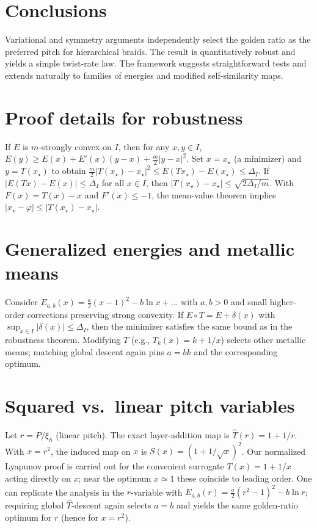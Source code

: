 \documentclass[11pt]{article}
\theoremstyle{remark}
\theoremstyle{definition}
\newcommand{\ph}{\varphi}
\begin{document}
\section{Conclusions}
Variational and symmetry arguments independently select the golden ratio as the preferred pitch for hierarchical braids. The result is quantitatively robust and yields a simple twist-rate law. The framework suggests straightforward tests and extends naturally to families of energies and modified self-similarity maps.

\appendix
\section{Proof details for robustness}
If $E$ is $m$-strongly convex on $I$, then for any $x,y\in I$, $E(y)\ge E(x)+E'(x)(y-x)+\tfrac{m}{2}|y-x|^2$. Set $x=x_\star$ (a minimizer) and $y=T(x_\star)$ to obtain $\tfrac{m}{2}|T(x_\star)-x_\star|^2\le E(Tx_\star)-E(x_\star)\le\Delta_I$. If $|E(Tx)-E(x)|\le\Delta_I$ for all $x\in I$, then $|T(x_\star)-x_\star|\le \sqrt{2\Delta_I/m}$. With $F(x)=T(x)-x$ and $F'(x)\le-1$, the mean-value theorem implies $|x_\star-\ph|\le |T(x_\star)-x_\star|$.

\section{Generalized energies and metallic means}
Consider $E_{a,b}(x)=\tfrac a2(x-1)^2 - b\ln x + \dots$ with $a,b>0$ and small higher-order corrections preserving strong convexity. If $E\circ T=E+\delta(x)$ with $\sup_{x\in I}|\delta(x)|\le\Delta_I$, then the minimizer satisfies the same bound as in the robustness theorem. Modifying $T$ (e.g., $T_k(x)=k+1/x$) selects other metallic means; matching global descent again pins $a=bk$ and the corresponding optimum.

\section{Squared vs.\ linear pitch variables}\label{app:squared-vs-linear}
Let $r=P/\xi_h$ (linear pitch). The exact layer-addition map is $\widehat T(r)=1+1/r$. With $x=r^2$, the induced map on $x$ is $S(x)=(1+1/\sqrt{x})^2$. Our normalized Lyapunov proof is carried out for the convenient surrogate $T(x)=1+1/x$ acting directly on $x$; near the optimum $x\simeq1$ these coincide to leading order. One can replicate the analysis in the $r$-variable with $E_{a,b}(r)=\tfrac{a}{2}(r^2-1)^2-b\ln r$; requiring global $\widehat T$-descent again selects $a=b$ and yields the same golden-ratio optimum for $r$ (hence for $x=r^2$).
\end{document}
